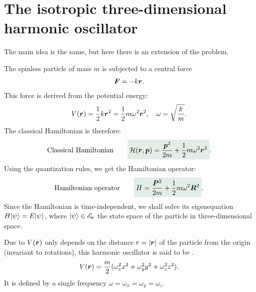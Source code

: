 \section{The isotropic three-dimensional harmonic oscillator}
The main idea is the same, but here there is an extension of the problem.

The spinless particle of mass $m$ is subjected to a central force 
\begin{align}
    \bm{F}=-k\bm{r}.
\end{align}
This force is derived from the potential energy:
\begin{align}
    V(\bm{r})=\frac{1}{2}k\bm{r}^2=\frac{1}{2}m\omega^2\bm{r}^2,\quad\omega=\sqrt{\frac{k}{m}}.
\end{align}
The classical Hamiltonian is therefore:
\begin{align}
    \text{Classical Hamiltonian}\qquad\highlight{\mathcal{H}(\bR,\bp)=\frac{\bp^2}{2m}+\frac{1}{2}m\omega^2\bR^2}.
\end{align}
Using the quantization rules, we get the Hamiltonian operator:
\begin{align}
    \text{Hamiltonian operator}\qquad\highlight{H=\frac{\BP^2}{2m}+\frac{1}{2}m\omega^2\BR^2}.
\end{align}
Since the Hamiltonian is time-independent, we shall solve its eigenequation $H|\psi\rangle=E|\psi\rangle$, where $|\psi\rangle\in\mathscr{E}_{\bm{r}}$ the state space 
of the particle in three-dimensional space.

\begin{emphasizer}
    Due to $V(\bm{r})$ only depends on the distance $r=|\bm{r}|$ of the particle from the origin (invariant to rotations), 
    this harmonic oscillator is said to be . 
    \begin{align}
        V(\bm{r})=\frac{m}{2}(\omega^2_xx^2+\omega^2_yy^2+\omega^2_zz^2).
    \end{align}
    It is defined by a single frequency $\omega=\omega_x=\omega_y=\omega_z$.
\end{emphasizer}

